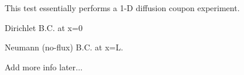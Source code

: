 This test essentially performs a 1-D diffusion coupon experiment. 

Dirichlet B.C. at x=0

Neumann (no-flux) B.C. at x=L.

Add more info later...
